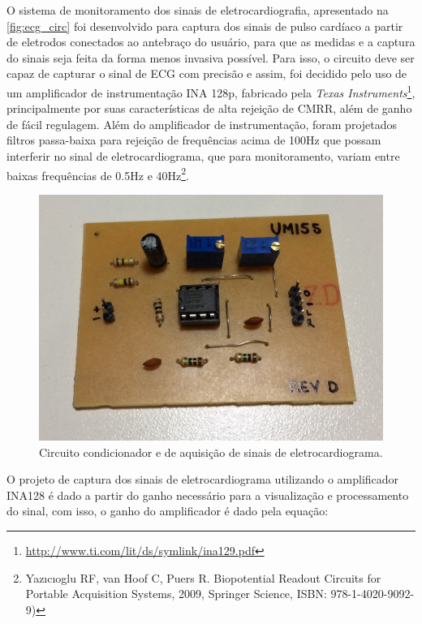 O sistema de monitoramento dos sinais de eletrocardiografia, apresentado na \ref{fig:ecg_circ}
foi desenvolvido para captura dos sinais de pulso cardíaco a partir de eletrodos
conectados ao antebraço do usuário, para que as medidas e a captura do sinais seja
feita da forma menos invasiva possível. Para isso, o circuito deve ser capaz de
capturar o sinal de ECG com precisão e assim, foi decidido pelo uso de um amplificador
de instrumentação INA 128p, fabricado pela \textit{Texas Instruments}\footnote{\url{http://www.ti.com/lit/ds/symlink/ina129.pdf}},
principalmente por suas características de alta rejeição de CMRR, além de ganho de fácil regulagem.
Além do amplificador de instrumentação, foram projetados filtros passa-baixa para
rejeição de frequências acima de 100Hz que possam interferir no sinal de eletrocardiograma,
que para monitoramento, variam entre baixas frequências de 0.5Hz e 40Hz\footnote{ Yazıcıoglu RF, van Hoof C,
Puers R. Biopotential Readout Circuits for Portable Acquisition Systems, 2009,
Springer Science, ISBN: 978-1-4020-9092-9)}.

\begin{figure}
    \begin{center}
        \includegraphics[scale=0.1]{figuras/ecg_circ.jpg}
    \end{center}
    \caption{Circuito condicionador e de aquisição de sinais de eletrocardiograma.}
    \label{fig:ecg_ele}
\end{figure}

O projeto de captura dos sinais de eletrocardiograma utilizando o amplificador INA128
é dado a partir do ganho necessário para a visualização e processamento do sinal, com isso,
o ganho do amplificador é dado pela equação:

